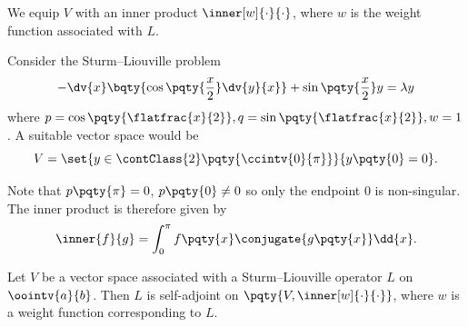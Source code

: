 We equip \(V\) with an inner product \(\inner[w]{\cdot}{\cdot}\), where \(w\) is the weight function associated with \(L\). 

\begin{example}
    Consider the Sturm--Liouville problem
    \begin{equation}
        - \dv{x} \bqty{\cos \pqty{\frac{x}{2}} \dv{y}{x}} + \sin \pqty{\frac{x}{2}} y = \lambda y
    \end{equation}
    where \(p = \cos \pqty{\flatfrac{x}{2}},  q = \sin \pqty{\flatfrac{x}{2}}, w = 1\). A suitable vector space would be
    \begin{equation}
        V = \set{y \in \contClass{2}\pqty{\ccintv{0}{\pi}}}{y\pqty{0} = 0}.
    \end{equation}

    Note that \(p\pqty{\pi} = 0\), \(p\pqty{0} \neq 0\) so only the endpoint \(0\) is non-singular. The inner product is therefore given by
    \begin{equation}
        \inner{f}{g} = \int_{0}^{\pi} f\pqty{x} \conjugate{g\pqty{x}} \dd{x}.
    \end{equation}
\end{example}

\begin{proposition}
    Let \(V\) be a vector space associated with a Sturm--Liouville operator \(L\) on \(\oointv{a}{b}\). Then \(L\) is self-adjoint on \(\pqty{V, \inner[w]{\cdot}{\cdot}}\), where \(w\) is a weight function corresponding to \(L\).
\end{proposition}

